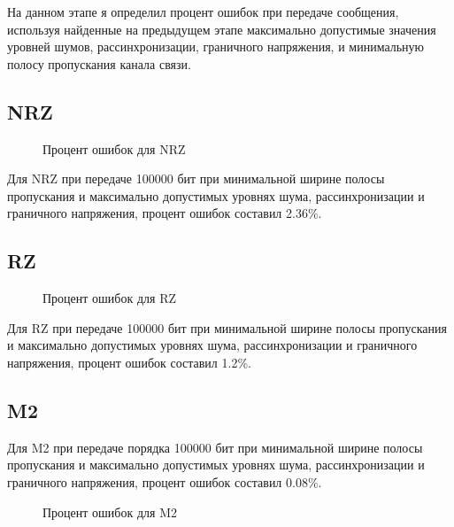 На данном этапе я определил процент ошибок при передаче сообщения, используя найденные на предыдущем этапе максимально допустимые значения уровней шумов, рассинхронизации, граничного напряжения, и минимальную полосу пропускания канала связи.

\subsection{NRZ}

\begin{wrapfigure}{l}{0.65\textwidth}
	\centering
	\caption{Процент ошибок для NRZ}
	\vspace{-115pt}
\end{wrapfigure}

Для NRZ при передаче 100000 бит при минимальной ширине полосы пропускания и максимально допустимых уровнях шума, рассинхронизации и граничного напряжения, процент ошибок составил 2.36\%.

\thispagestyle{empty}

\newpage

\subsection{RZ}

\vspace{0.4cm}
\begin{wrapfigure}{r}{0.6\textwidth}
	\centering
	\caption{Процент ошибок для RZ}
\end{wrapfigure}

Для RZ при передаче 100000 бит при минимальной ширине полосы пропускания и максимально допустимых уровнях шума, рассинхронизации и граничного напряжения, процент ошибок составил 1.2\%.

\subsection{M2}

Для M2 при передаче порядка 100000 бит при минимальной ширине полосы пропускания и максимально допустимых уровнях шума, рассинхронизации и граничного напряжения, процент ошибок составил 0.08\%.

\vspace{0.4cm}
\begin{figure}[H]
	\centering
	\caption{Процент ошибок для M2}
\end{figure}

